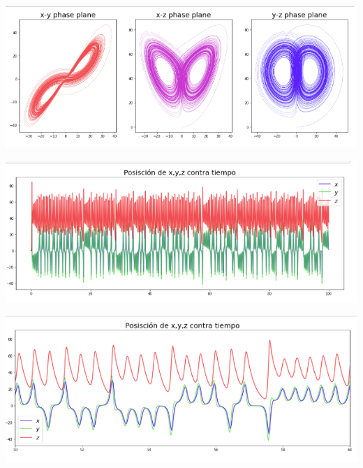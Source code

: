 \documentclass{article}
\begin{document}
\begin{center}
\includegraphics[scale=0.5]{Eval5.png}
\end{center}

\begin{center}
\includegraphics[scale=0.5]{Eval6.png}
\end{center}
\begin{center}
\includegraphics[scale=0.7]{Eval7.png}
\end{center}
\end{document}
